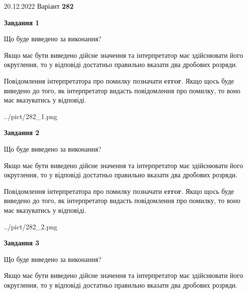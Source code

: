\documentclass[12pt, ukrainian]{article}
\begin{document}
{20.12.2022 Варіант \No \textbf { 282 }\par}
{
\begin {Large}

{\begin {center}\textbf{Завдання 1}\end {center}}\par
Що буде виведено за виконання? \par

Якщо має бути виведено дійсне значення та інтерпретатор має здійснювати його округлення, 
то у відповіді достатньо правильно вказати два дробових розряди.

Повідомлення інтерпретатора про помилку позначати \textbf{error}.
Якщо щось буде виведено до того, як інтерпретатор видасть повідомлення про помилку, 
то воно має вказуватись у відповіді. \par

\begin{center}
	{../pict/282_1.png}
\end{center}
\newpage

{\begin {center}\textbf{Завдання 2}\end {center}}\par
Що буде виведено за виконання? \par

Якщо має бути виведено дійсне значення та інтерпретатор має здійснювати його округлення, 
то у відповіді достатньо правильно вказати два дробових розряди.

Повідомлення інтерпретатора про помилку позначати \textbf{error}.
Якщо щось буде виведено до того, як інтерпретатор видасть повідомлення про помилку, 
то воно має вказуватись у відповіді. \par

\begin{center}
	{../pict/282_2.png}
\end{center}
\newpage

{\begin {center}\textbf{Завдання 3}\end {center}}\par
Що буде виведено за виконання? \par

Якщо має бути виведено дійсне значення та інтерпретатор має здійснювати його округлення, 
то у відповіді достатньо правильно вказати два дробових розряди.


\end{Large}}
\end{document}
